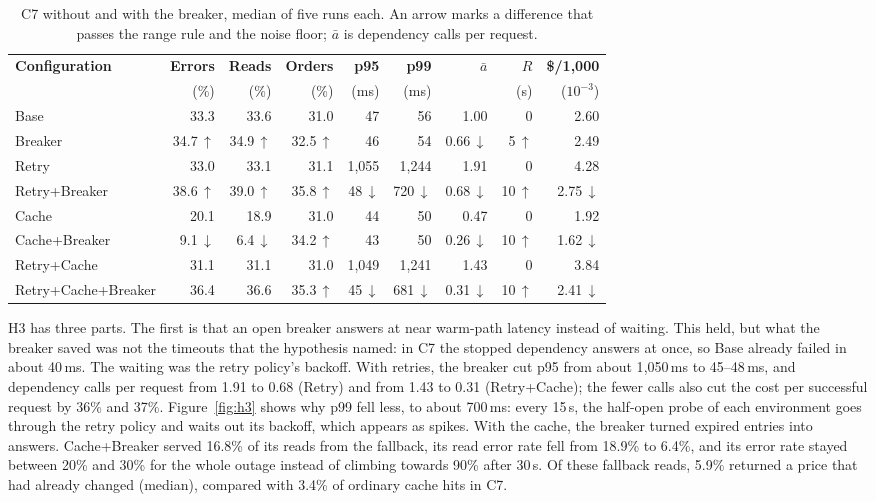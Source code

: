 \documentclass[10pt]{article}
\begin{document}
\begin{table}[htbp]
\centering
\footnotesize
\begin{tabular}{@{}lrrrrrrrr@{}}
\toprule
\textbf{Configuration} & \textbf{Errors} & \textbf{Reads} & \textbf{Orders} & \textbf{p95} & \textbf{p99} & $\bar{a}$ & $R$ & \textbf{\$/1{,}000} \\
 & (\%) & (\%) & (\%) & (ms) & (ms) & & (s) & ($10^{-3}$) \\
\midrule
Base & 33.3 & 33.6 & 31.0 & 47 & 56 & 1.00 & 0 & 2.60 \\
Breaker & 34.7\,$\uparrow$ & 34.9\,$\uparrow$ & 32.5\,$\uparrow$ & 46 & 54 & 0.66\,$\downarrow$ & 5\,$\uparrow$ & 2.49 \\
\midrule
Retry & 33.0 & 33.1 & 31.1 & 1,055 & 1,244 & 1.91 & 0 & 4.28 \\
Retry+Breaker & 38.6\,$\uparrow$ & 39.0\,$\uparrow$ & 35.8\,$\uparrow$ & 48\,$\downarrow$ & 720\,$\downarrow$ & 0.68\,$\downarrow$ & 10\,$\uparrow$ & 2.75\,$\downarrow$ \\
\midrule
Cache & 20.1 & 18.9 & 31.0 & 44 & 50 & 0.47 & 0 & 1.92 \\
Cache+Breaker & 9.1\,$\downarrow$ & 6.4\,$\downarrow$ & 34.2\,$\uparrow$ & 43 & 50 & 0.26\,$\downarrow$ & 10\,$\uparrow$ & 1.62\,$\downarrow$ \\
\midrule
Retry+Cache & 31.1 & 31.1 & 31.0 & 1,049 & 1,241 & 1.43 & 0 & 3.84 \\
Retry+Cache+Breaker & 36.4 & 36.6 & 35.3\,$\uparrow$ & 45\,$\downarrow$ & 681\,$\downarrow$ & 0.31\,$\downarrow$ & 10\,$\uparrow$ & 2.41\,$\downarrow$ \\
\bottomrule
\end{tabular}
\caption{C7 without and with the breaker, median of five runs each. An arrow
marks a difference that passes the range rule and the noise floor; $\bar{a}$ is
dependency calls per request.}
\label{tab:h3}
\end{table}

H3 has three parts. The first is that an open breaker answers at near
warm-path latency instead of waiting. This held, but what the breaker saved was
not the timeouts that the hypothesis named: in C7 the stopped dependency answers
at once, so Base already failed in about 40\,ms. The waiting was the retry
policy's backoff. With retries, the breaker cut p95 from about 1{,}050\,ms to
45--48\,ms, and dependency calls per request from 1.91 to 0.68 (Retry) and from
1.43 to 0.31 (Retry+Cache); the fewer calls also cut the cost per successful
request by 36\% and 37\%. Figure~\ref{fig:h3} shows why p99 fell less, to about
700\,ms: every 15\,s, the half-open probe of each environment goes through the
retry policy and waits out its backoff, which appears as spikes. With the
cache, the breaker turned expired entries into answers. Cache+Breaker served
16.8\% of its reads from the fallback, its read error rate fell from 18.9\% to
6.4\%, and its error rate stayed between 20\% and 30\% for the whole outage
instead of climbing towards 90\% after 30\,s. Of these fallback reads, 5.9\%
returned a price that had already changed (median), compared with 3.4\% of
ordinary cache hits in C7.
\end{document}
